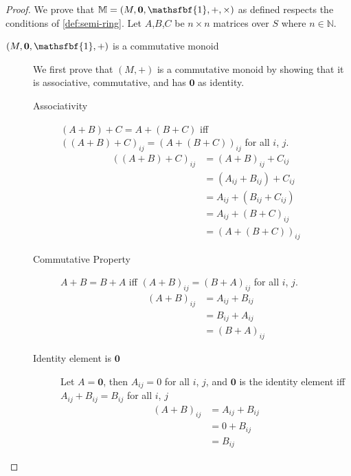 \documentclass[runningheads]{llncs}
\renewcommand{\oplus}{+}
\renewcommand{\otimes}{\times}
\begin{document}
\begin{proof}
	We prove that \(\mathbb{M} = (M,\mathbf{0} ,\mathsfbf{1} ,\oplus ,\otimes )\) as defined respects the conditions of \autoref{def:semi-ring}.
	Let \(A\),\(B\),\(C\) be \(n \times n\) matrices over \(S\) where \(n \in \mathbb{N}\).
	\begin{description}
		\item[\( (M,\mathbf{0} ,\mathsfbf{1} ,\oplus )\) is a commutative monoid]
			We first prove that \((M, \oplus )\) is a commutative monoid by showing that it is associative, commutative, and has \(\mathbf{0} \) as identity.

			\begin{description}
				\item[Associativity]
					\((A \oplus B) \oplus C = A \oplus (B \oplus C)\) iff \( ((A \oplus B) \oplus C)_{ij} = (A \oplus (B \oplus C))_{ij}\) for all \(i\), \(j\).
					\begin{align*}
						((A \oplus B) \oplus C)_{ij} & = (A \oplus B)_{ij} + C_{ij}                                 \\
						                             & = (A_{ij} + B_{ij}) + C_{ij}                                 \\
						                             & = A_{ij} + (B_{ij} + C_{ij}) \tag{by associativity of \(+\)} \\
						                             & = A_{ij} + (B \oplus C)_{ij}                                 \\
						                             & = (A \oplus ( B \oplus C))_{ij}
					\end{align*}

				\item[Commutative Property]
					\(A \oplus B = B \oplus A\) iff \((A \oplus B)_{ij} = (B \oplus A)_{ij}\) for all \(i\), \(j\).
					\begin{align*}
						(A \oplus B)_{ij} & = A_{ij} + B_{ij}                                 \\
						                  & = B_{ij} + A_{ij} \tag{by commutativity of \(+\)} \\
						                  & = (B \oplus A)_{ij}
					\end{align*}

				\item[Identity element is \(\mathbf{0} \)]
					Let \(A = \mathbf{0} \), then \(A_{ij} = 0\) for all \(i\), \(j\), and \(\mathbf{0} \) is the identity element iff \(A_{ij} + B_{ij} = B_{ij}\) for all \(i\), \(j\)
					\begin{align*}
						(A \oplus B)_{ij} & = A_{ij} + B_{ij}                       \\
						                  & = 0 + B_{ij} \tag{by identity of \(+\)} \\
						                  & = B_{ij}
					\end{align*}
			\end{description}


\end{description}
\end{proof}
\end{document}
